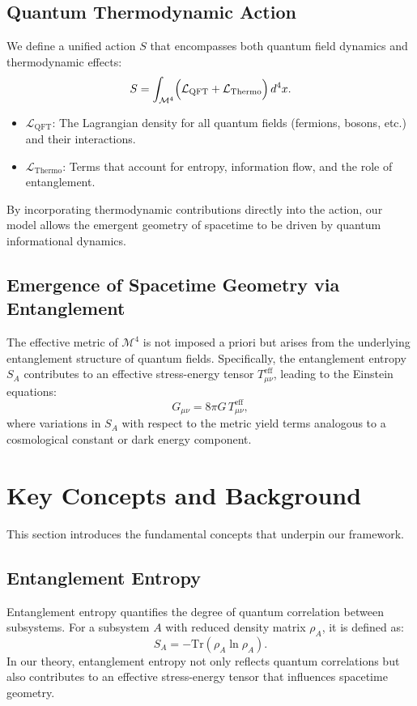 \documentclass[12pt, a4paper]{article}
\begin{document}
\subsection{Quantum Thermodynamic Action}
We define a unified action $S$ that encompasses both quantum field dynamics and thermodynamic effects:
\begin{equation}
    S = \int_{\mathcal{M}^{4}} \Bigl( \mathcal{L}_{\text{QFT}} + \mathcal{L}_{\text{Thermo}} \Bigr) \, d^{4}x.
\end{equation}
\begin{itemize}
    \item $\mathcal{L}_{\text{QFT}}$: The Lagrangian density for all quantum fields (fermions, bosons, etc.) and their interactions.
    \item $\mathcal{L}_{\text{Thermo}}$: Terms that account for entropy, information flow, and the role of entanglement.
\end{itemize}
By incorporating thermodynamic contributions directly into the action, our model allows the emergent geometry of spacetime to be driven by quantum informational dynamics.

\subsection{Emergence of Spacetime Geometry via Entanglement}
The effective metric of $\mathcal{M}^4$ is not imposed a priori but arises from the underlying entanglement structure of quantum fields. Specifically, the entanglement entropy $S_A$ contributes to an effective stress-energy tensor $T_{\mu\nu}^{\text{eff}}$, leading to the Einstein equations:
\begin{equation}
    G_{\mu\nu} = 8\pi G\, T_{\mu\nu}^{\text{eff}},
\end{equation}
where variations in $S_A$ with respect to the metric yield terms analogous to a cosmological constant or dark energy component.


\section{Key Concepts and Background}
This section introduces the fundamental concepts that underpin our framework.

\subsection{Entanglement Entropy}
Entanglement entropy quantifies the degree of quantum correlation between subsystems. For a subsystem \(A\) with reduced density matrix \(\rho_A\), it is defined as:
\begin{equation}
    S_A = -\text{Tr}(\rho_A \ln \rho_A).
\end{equation}
In our theory, entanglement entropy not only reflects quantum correlations but also contributes to an effective stress-energy tensor that influences spacetime geometry.
\end{document}
